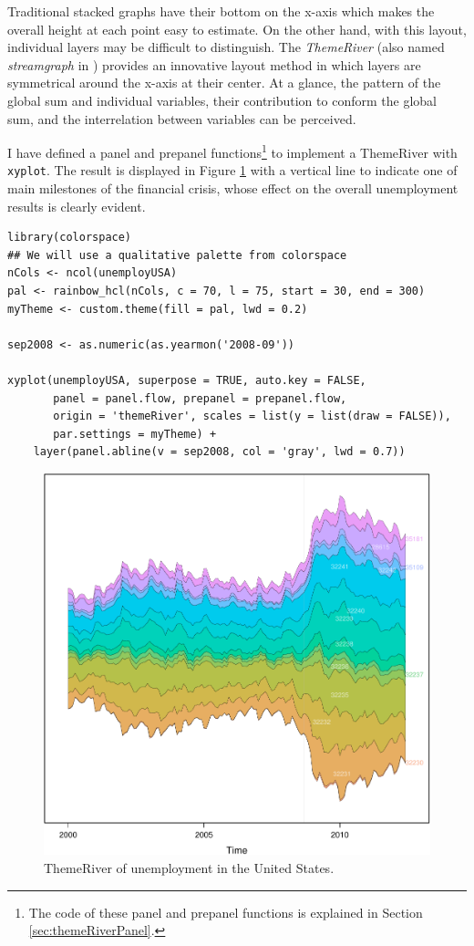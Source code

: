 Traditional stacked graphs have their bottom on the x-axis which makes
the overall height at each point easy to estimate. On the other hand,
with this layout, individual layers may be difficult to
distinguish. The \emph{ThemeRiver} \cite{Havre.Hetzler.ea2002} (also named
\emph{streamgraph} in \cite{Byron.Wattenberg2008}) provides an innovative
layout method in which layers are symmetrical around the x-axis at
their center. At a glance, the pattern of the global sum and
individual variables, their contribution to conform the global sum,
and the interrelation between variables can be perceived.

I have defined a panel and prepanel functions\footnote{The code of these panel and prepanel functions is explained
in Section \ref{sec:themeRiverPanel}.} to implement a
ThemeRiver with \texttt{xyplot}. The result is displayed in Figure
\ref{fig:unemployUSAThemeRiver} with a vertical line to indicate
one of main milestones of the financial crisis, whose effect on
the overall unemployment results is clearly evident.
\lstset{language=r,label= ,caption= ,captionpos=b,numbers=none}
\begin{lstlisting}
library(colorspace)
## We will use a qualitative palette from colorspace
nCols <- ncol(unemployUSA)
pal <- rainbow_hcl(nCols, c = 70, l = 75, start = 30, end = 300)
myTheme <- custom.theme(fill = pal, lwd = 0.2)

sep2008 <- as.numeric(as.yearmon('2008-09'))

xyplot(unemployUSA, superpose = TRUE, auto.key = FALSE,
       panel = panel.flow, prepanel = prepanel.flow,
       origin = 'themeRiver', scales = list(y = list(draw = FALSE)),
       par.settings = myTheme) +
    layer(panel.abline(v = sep2008, col = 'gray', lwd = 0.7))
\end{lstlisting}

\begin{figure}[htbp]
\centering
\includegraphics[width=.9\linewidth]{figs/unemployUSAThemeRiver.pdf}
\caption{ThemeRiver of unemployment in the United States. \label{fig:unemployUSAThemeRiver}}
\end{figure}

